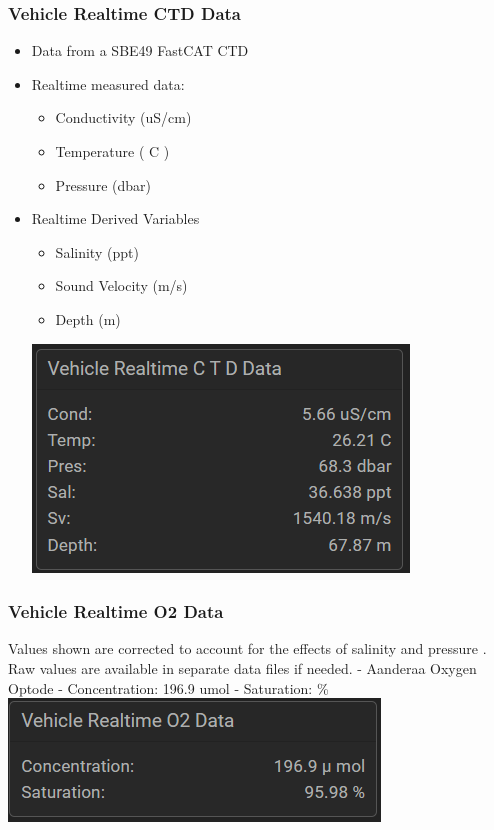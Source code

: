 \documentclass[
  letterpaper,
  DIV=11,
  numbers=noendperiod]{scrreprt}
\providecommand{\tightlist}{%
  \setlength{\itemsep}{0pt}\setlength{\parskip}{0pt}}\usepackage{longtable,booktabs,array}
\begin{document}
\hypertarget{vehicle-realtime-ctd-data}{%
\subsubsection{Vehicle Realtime CTD
Data}\label{vehicle-realtime-ctd-data}}

\begin{itemize}
\tightlist
\item
  Data from a SBE49 FastCAT CTD
\item
  Realtime measured data:

  \begin{itemize}
  \tightlist
  \item
    Conductivity (uS/cm)
  \item
    Temperature ( C )
  \item
    Pressure (dbar)
  \end{itemize}
\item
  Realtime Derived Variables

  \begin{itemize}
  \tightlist
  \item
    Salinity (ppt)
  \item
    Sound Velocity (m/s)
  \item
    Depth (m)
  \end{itemize}

  \includegraphics{images/image33.png}
\end{itemize}

\hypertarget{vehicle-realtime-o2-data}{%
\subsubsection{Vehicle Realtime O2
Data}\label{vehicle-realtime-o2-data}}

Values shown are corrected to account for the effects of salinity and
pressure . Raw values are available in separate data files if needed. -
Aanderaa Oxygen Optode - Concentration: 196.9 umol - Saturation: \%
\includegraphics{images/image30.png}
\end{document}
